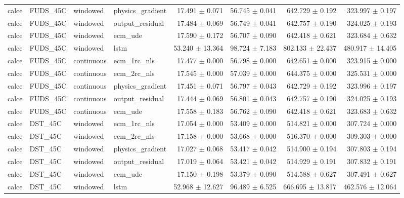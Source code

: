\begin{longtable}{llllrrrr}
calce & FUDS\_45C & windowed & physics\_gradient & 17.491 $\pm$ 0.071 & 56.745 $\pm$ 0.041 & 642.729 $\pm$ 0.192 & 323.997 $\pm$ 0.197 \\
calce & FUDS\_45C & windowed & output\_residual & 17.484 $\pm$ 0.069 & 56.749 $\pm$ 0.041 & 642.757 $\pm$ 0.190 & 324.025 $\pm$ 0.193 \\
calce & FUDS\_45C & windowed & ecm\_ude & 17.590 $\pm$ 0.172 & 56.707 $\pm$ 0.090 & 642.418 $\pm$ 0.621 & 323.684 $\pm$ 0.632 \\
calce & FUDS\_45C & windowed & lstm & 53.240 $\pm$ 13.364 & 98.724 $\pm$ 7.183 & 802.133 $\pm$ 22.437 & 480.917 $\pm$ 14.405 \\
calce & FUDS\_45C & continuous & ecm\_1rc\_nls & 17.477 $\pm$ 0.000 & 56.798 $\pm$ 0.000 & 642.651 $\pm$ 0.000 & 323.915 $\pm$ 0.000 \\
calce & FUDS\_45C & continuous & ecm\_2rc\_nls & 17.545 $\pm$ 0.000 & 57.039 $\pm$ 0.000 & 644.375 $\pm$ 0.000 & 325.531 $\pm$ 0.000 \\
calce & FUDS\_45C & continuous & physics\_gradient & 17.451 $\pm$ 0.071 & 56.797 $\pm$ 0.043 & 642.729 $\pm$ 0.192 & 323.996 $\pm$ 0.197 \\
calce & FUDS\_45C & continuous & output\_residual & 17.444 $\pm$ 0.069 & 56.801 $\pm$ 0.043 & 642.757 $\pm$ 0.190 & 324.025 $\pm$ 0.193 \\
calce & FUDS\_45C & continuous & ecm\_ude & 17.558 $\pm$ 0.183 & 56.762 $\pm$ 0.090 & 642.418 $\pm$ 0.621 & 323.683 $\pm$ 0.632 \\
calce & DST\_45C & windowed & ecm\_1rc\_nls & 17.054 $\pm$ 0.000 & 53.409 $\pm$ 0.000 & 514.821 $\pm$ 0.000 & 307.724 $\pm$ 0.000 \\
calce & DST\_45C & windowed & ecm\_2rc\_nls & 17.158 $\pm$ 0.000 & 53.668 $\pm$ 0.000 & 516.370 $\pm$ 0.000 & 309.303 $\pm$ 0.000 \\
calce & DST\_45C & windowed & physics\_gradient & 17.027 $\pm$ 0.068 & 53.417 $\pm$ 0.042 & 514.900 $\pm$ 0.194 & 307.803 $\pm$ 0.194 \\
calce & DST\_45C & windowed & output\_residual & 17.019 $\pm$ 0.064 & 53.421 $\pm$ 0.042 & 514.929 $\pm$ 0.191 & 307.832 $\pm$ 0.191 \\
calce & DST\_45C & windowed & ecm\_ude & 17.150 $\pm$ 0.198 & 53.379 $\pm$ 0.090 & 514.588 $\pm$ 0.627 & 307.491 $\pm$ 0.627 \\
calce & DST\_45C & windowed & lstm & 52.968 $\pm$ 12.627 & 96.489 $\pm$ 6.525 & 666.695 $\pm$ 13.817 & 462.576 $\pm$ 12.064 \\

\end{longtable}
